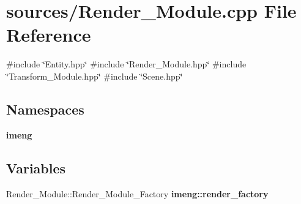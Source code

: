 \section{sources/\+Render\+\_\+\+Module.cpp File Reference}
\label{_render___module_8cpp}
{\ttfamily \#include \char`\"{}Entity.\+hpp\char`\"{}}\newline
{\ttfamily \#include \char`\"{}Render\+\_\+\+Module.\+hpp\char`\"{}}\newline
{\ttfamily \#include \char`\"{}Transform\+\_\+\+Module.\+hpp\char`\"{}}\newline
{\ttfamily \#include \char`\"{}Scene.\+hpp\char`\"{}}\newline
\subsection*{Namespaces}
\begin{DoxyCompactItemize}
\item 
 \textbf{ imeng}
\end{DoxyCompactItemize}
\subsection*{Variables}
\begin{DoxyCompactItemize}
\item 
Render\+\_\+\+Module\+::\+Render\+\_\+\+Module\+\_\+\+Factory \textbf{ imeng\+::render\+\_\+factory}
\end{DoxyCompactItemize}
